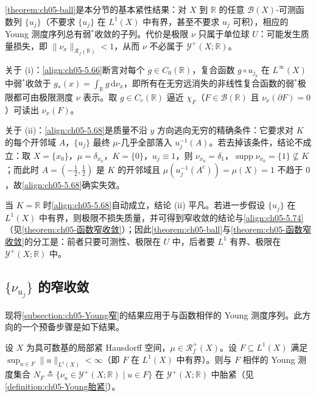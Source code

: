 \documentclass[../../main.tex]{subfiles}%
\begin{document}
\begin{remark}\label{remark:ch05-ball注}
\cref{theorem:ch05-ball}是本分节的基本紧性结果：对 $X$ 到 $\mathbb{R}$ 的任意 $\mathscr{B}(X)$-可测函数列 $\{u_j\}$（不要求 $\{u_j\}$ 在 $L^1(X)$ 中有界，甚至不要求 $u_j$ 可积），相应的 Young 测度序列总有弱$^*$收敛的子列。代价是极限 $\nu$ 只属于单位球 $U$：可能发生质量损失，即 $\|\nu_x\|_{\mathscr{R}_f(\mathbb{R})}<1$，从而 $\nu$ 不必属于 $\mathcal{Y}^+(X;\mathbb{R})$。

关于 (i)：\eqref{align:ch05-5.66}断言对每个 $g\in C_0(\mathbb{R})$，复合函数 $g\circ u_{j_k}$ 在 $L^\infty(X)$ 中弱$^*$收敛于 $g_*(x)=\int_{\mathbb{R}}g\,\mathrm{d}\nu_x$，即所有在无穷远消失的非线性复合函数的弱$^*$极限都可由极限测度 $\nu$ 表示。取 $g\in C_c(\mathbb{R})$ 逼近 $\chi_F$（$F\in\mathscr{B}(\mathbb{R})$ 且 $\nu_x(\partial F)=0$）可读出 $\nu_x(F)$。

关于 (ii)：\eqref{align:ch05-5.68}是质量不沿 $y$ 方向逃向无穷的精确条件：它要求对 $K$ 的每个开邻域 $A$，$\{u_j\}$ 最终 $\mu$-几乎全部落入 $u_j^{-1}(A)$。若去掉该条件，结论不成立：取 $X=\{x_0\}$，$\mu=\delta_{x_0}$，$K=\{0\}$，$u_j\equiv1$，则 $\nu_{x_0}=\delta_1$，$\operatorname{supp}\nu_{x_0}=\{1\}\not\subseteq K$；而此时 $A=(-\tfrac12,\tfrac12)$ 是 $K$ 的开邻域且 $\mu(u_j^{-1}(A^c))=\mu(X)=1$ 不趋于 $0$，故\eqref{align:ch05-5.68}确实失效。

当 $K=\mathbb{R}$ 时\eqref{align:ch05-5.68}自动成立，结论 (ii) 平凡。若进一步假设 $\{u_j\}$ 在 $L^1(X)$ 中有界，则极限不损失质量，并可得到窄收敛的结论与\eqref{align:ch05-5.74}（见\cref{theorem:ch05-函数窄收敛}）；因此\cref{theorem:ch05-ball}与\cref{theorem:ch05-函数窄收敛}的分工是：前者只要可测性、极限在 $U$ 中，后者要 $L^1$ 有界、极限在 $\mathcal{Y}^+(X;\mathbb{R})$ 中。
\end{remark}

\subsection{$\{\nu_{u_j}\}$ 的窄收敛}\label{subsection:ch05-函数窄}

现将\cref{subsection:ch05-Young窄}的结果应用于与函数相伴的 Young 测度序列。此方向的一个预备步骤是如下结果。

\begin{proposition}\label{proposition:ch05-有界紧}\label{proposition:ch05-弱星紧}
设 $X$ 为具可数基的局部紧 Hausdorff 空间，$\mu\in\mathscr{R}^+_f(X)$。设 $F\subseteq L^1(X)$ 满足 $\sup_{u\in F}\|u\|_{L^1(X)}<\infty$（即 $F$ 在 $L^1(X)$ 中有界）。则与 $F$ 相伴的 Young 测度集合 $N_F\triangleq\{\nu_u\in\mathcal{Y}^+(X;\mathbb{R})\mid u\in F\}$ 在 $\mathcal{Y}^+(X;\mathbb{R})$ 中胎紧（见\cref{definition:ch05-Young胎紧}）。
\end{proposition}
\end{document}

